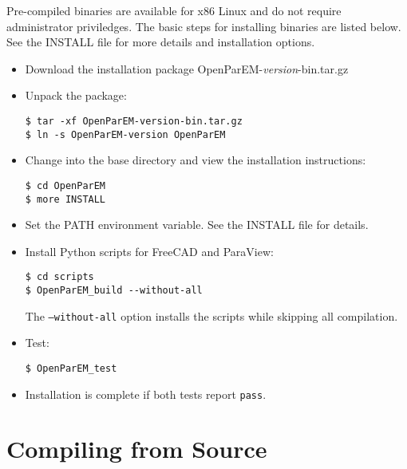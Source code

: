 \documentclass[titlepage]{article}
\renewcommand\_{\textunderscore\linebreak[1]}
\begin{document}
Pre-compiled binaries are available for x86 Linux and do not require administrator priviledges.
The basic steps for installing binaries are listed below.  See the INSTALL file for more details and installation options.
\begin{itemize}[nosep]
   \item Download the installation package OpenParEM-\textit{version}-bin.tar.gz
   \item Unpack the package:
         \begin{Verbatim}
$ tar -xf OpenParEM-version-bin.tar.gz
$ ln -s OpenParEM-version OpenParEM
         \end{Verbatim}
   \item Change into the base directory and view the installation instructions:
         \begin{Verbatim}
$ cd OpenParEM
$ more INSTALL
         \end{Verbatim}
   \item Set the PATH environment variable.  See the INSTALL file for details.
   \item Install Python scripts for FreeCAD and ParaView:
         \begin{Verbatim}
$ cd scripts
$ OpenParEM_build --without-all
         \end{Verbatim}
         The \texttt{--without-all} option installs the scripts while skipping all compilation.
   \item Test:
         \begin{Verbatim}
$ OpenParEM_test
         \end{Verbatim}
   \item Installation is complete if both tests report \texttt{pass}.
\end{itemize}

\section{Compiling from Source}
\end{document}
